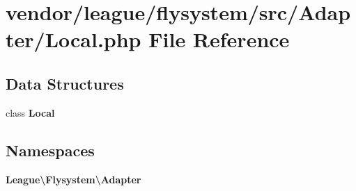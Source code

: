\section{vendor/league/flysystem/src/\+Adapter/\+Local.php File Reference}
\label{_local_8php}
\subsection*{Data Structures}
\begin{DoxyCompactItemize}
\item 
class {\bf Local}
\end{DoxyCompactItemize}
\subsection*{Namespaces}
\begin{DoxyCompactItemize}
\item 
 {\bf League\textbackslash{}\+Flysystem\textbackslash{}\+Adapter}
\end{DoxyCompactItemize}
